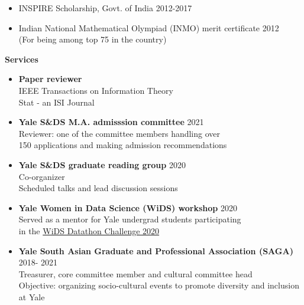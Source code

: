 \documentclass[letterpaper,11pt,oneside]{article}
\theoremstyle{definition}
\begin{document}
	\begin{itemize}
		\item [] INSPIRE Scholarship, Govt. of India \hfill 2012-2017
		\item [] Indian National Mathematical Olympiad (INMO) merit certificate \hfill 2012\\
		(For being among top 75 in the country)
	\end{itemize}

	
	\noindent \textbf{Services}
	\begin{itemize}
		\item[]
		{\bf Paper reviewer}\\
		IEEE Transactions on Information Theory\\
		Stat - an ISI Journal
		
		
		\item[] {\bf Yale S\&DS M.A. admisssion committee} \hfill 2021\\
		Reviewer: one of the committee members
		handling over\\ 150 applications
		and making admission recommendations
		
		\item[] {\bf Yale S\&DS graduate reading group} \hfill 2020\\
		Co-organizer\\
		Scheduled talks and lead discussion sessions
		
		\item[] {\bf Yale Women in Data Science (WiDS) workshop} \hfill 2020\\
		Served as a mentor for Yale undergrad students participating \\
		in the \href{https://www.widsconference.org/blog_archive/wids-datathon-2020-workshops-worldwide}{WiDS Datathon Challenge 2020}
		
		\item[] {\bf Yale South Asian Graduate and Professional Association (SAGA)} \hfill 2018- 2021\\
		Treasurer, core committee member and cultural committee head\\
		Objective: organizing socio-cultural events to promote diversity and inclusion at Yale
		
		
	\end{itemize}

	\clearpage
	
\end{document}
